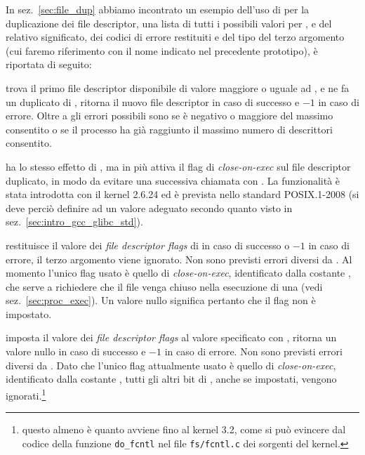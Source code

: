 In sez.~\ref{sec:file_dup} abbiamo incontrato un esempio dell'uso di
 per la duplicazione dei file descriptor, una lista di tutti i
possibili valori per , e del relativo significato, dei codici di
errore restituiti e del tipo del terzo argomento (cui faremo riferimento con
il nome indicato nel precedente prototipo), è riportata di seguito:
\begin{basedescript}{\desclabelwidth{1.8cm}}
\item[\constd{F\_DUPFD}] trova il primo file descriptor disponibile di valore
  maggiore o uguale ad , e ne fa un duplicato
  di , ritorna il nuovo file descriptor in caso di successo e $-1$
  in caso di errore. Oltre a  gli errori possibili sono
   se  è negativo o maggiore del massimo consentito
  o  se il processo ha già raggiunto il massimo numero di
  descrittori consentito.


\item[\constd{F\_DUPFD\_CLOEXEC}] ha lo stesso effetto di , ma
  in più attiva il flag di \textit{close-on-exec} sul file descriptor
  duplicato, in modo da evitare una successiva chiamata con
  . La funzionalità è stata introdotta con il kernel 2.6.24 ed
  è prevista nello standard POSIX.1-2008 (si deve perciò definire
   ad un valore adeguato secondo quanto visto in
  sez.~\ref{sec:intro_gcc_glibc_std}).

\item[\constd{F\_GETFD}] restituisce il valore dei \textit{file descriptor
    flags} di  in caso di successo o $-1$ in caso di errore, il
  terzo argomento viene ignorato. Non sono previsti errori diversi da
  . Al momento l'unico flag usato è quello di
  \textit{close-on-exec}, identificato dalla costante , che
  serve a richiedere che il file venga chiuso nella esecuzione di una
   (vedi sez.~\ref{sec:proc_exec}). Un valore nullo significa
  pertanto che il flag non è impostato.

\item[\constd{F\_SETFD}] imposta il valore dei \textit{file descriptor flags}
  al valore specificato con , ritorna un valore nullo in caso di
  successo e $-1$ in caso di errore. Non sono previsti errori diversi da
  . Dato che l'unico flag attualmente usato è quello di
  \textit{close-on-exec}, identificato dalla costante ,
  tutti gli altri bit di , anche se impostati, vengono
  ignorati.\footnote{questo almeno è quanto avviene fino al kernel 3.2, come
    si può evincere dal codice della funzione \texttt{do\_fcntl} nel file
    \texttt{fs/fcntl.c} dei sorgenti del kernel.}


\end{basedescript}
